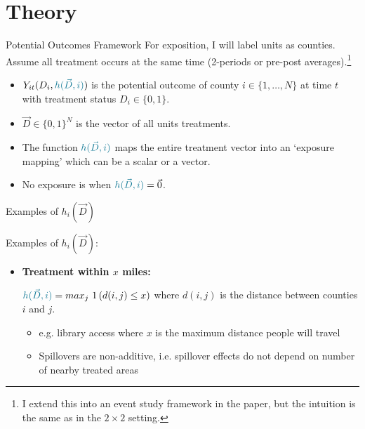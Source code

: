 \documentclass[aspectratio=169]{beamer}
\begin{document}
\section{Theory}


\begin{frame}{Potential Outcomes Framework}
    For exposition, I will label units as counties. Assume all treatment occurs at the same time (2-periods or pre-post averages).\footnote{I extend this into an event study framework in the paper, but the intuition is the same as in the $2 \times 2$ setting.}
    
    \begin{itemize}
        \item $Y_{it}(D_i, \textcolor{alice}{h(\vec{D}, i)})$ is the potential outcome of county $i \in \{ 1, \dots, N \}$ at time $t$ with treatment status $D_i \in \{0, 1\}$.
        
        \item $\vec{D} \in \{0,1\}^N$ is the vector of all units treatments.
        
        \pause
        \item The function $\textcolor{alice}{h(\vec{D}, i)}$ maps the entire treatment vector into an `exposure mapping' which can be a scalar or a vector.
        
        \pause
        \item No exposure is when $\textcolor{alice}{h(\vec{D}, i)} = \vec{0}$.
    \end{itemize}
\end{frame}


\begin{frame}{Examples of $h_i(\vec{D})$}
    
    Examples of $h_i(\vec{D})$:
    
    \begin{itemize}
        \item \textbf{Treatment within $x$ miles:}
        
        $\textcolor{alice}{h(\vec{D}, i)} = max_j \ 1\left(d(i, j\right) \leq x)$ where $d(i,j)$ is the distance between counties $i$ and $j$. 

        \begin{itemize}
            \item e.g. library access where $x$ is the maximum distance people will travel
            
            \item Spillovers are non-additive, i.e. spillover effects do not depend on number of nearby treated areas
        \end{itemize}

    \end{itemize}
\end{frame}
\end{document}
